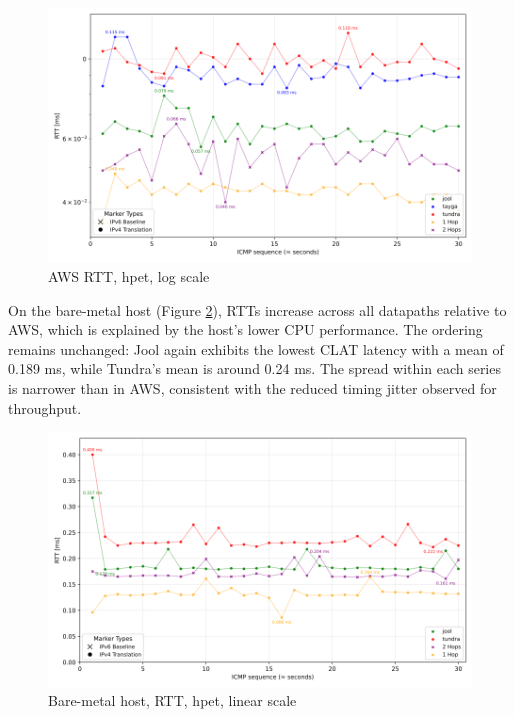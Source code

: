 \begin{figure}[H]
    \centering
    \includegraphics[width=1\textwidth]{resources/plots/CombinedPlot/RTT/AWS_ping_rtt_Ping_30s_log.png}
    \caption{AWS RTT, hpet, log scale}
    \label{fig:AWS_icmp_sameScale_hpet_log}

\end{figure}

On the bare-metal host (Figure \ref{fig:Local_icmp_sameScale_hpet_linear}), RTTs increase across all datapaths relative to AWS, which is explained by the host’s lower CPU performance. The ordering remains unchanged: Jool again exhibits the lowest CLAT latency with a mean of 0.189 ms, while Tundra’s mean is around 0.24 ms. The spread within each series is narrower than in AWS, consistent with the reduced timing jitter observed for throughput.

\begin{figure}[H]
    \centering
    \includegraphics[width=1\textwidth]{resources/plots/CombinedPlot/RTT/Single_ping_rtt_Ping_30s_linear.png}
    \caption{Bare-metal host, RTT, hpet, linear scale}
    \label{fig:Local_icmp_sameScale_hpet_linear}
\end{figure}

